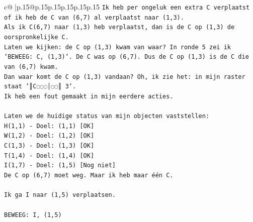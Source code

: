 \documentclass{article}
\begin{document}
{\begin{supertabular}{c@{$\;$}|p{.15\linewidth}@{}p{.15\linewidth}p{.15\linewidth}p{.15\linewidth}p{.15\linewidth}p{.15\linewidth}}
{{{\texttt{Ik heb per ongeluk een extra C verplaatst of ik heb de C van (6,7) al verplaatst naar (1,3).} \\
\texttt{Als ik C(6,7) naar (1,3) heb verplaatst, dan is de C op (1,3) de oorspronkelijke C.} \\
\texttt{Laten we kijken: de C op (1,3) kwam van waar? In ronde 5 zei ik `BEWEEG: C, (1,3)`. De C was op (6,7). Dus de C op (1,3) is de C die van (6,7) kwam.} \\
\texttt{Dan waar komt de C op (1,3) vandaan? Oh, ik zie het: in mijn raster staat `║C◌◌◌│◌◌║ 3`.} \\
\texttt{Ik heb een fout gemaakt in mijn eerdere acties.} \\
\\ 
\texttt{Laten we de huidige status van mijn objecten vaststellen:} \\
\texttt{H(1,1) {-} Doel: (1,1) {[}OK{]}} \\
\texttt{W(1,2) {-} Doel: (1,2) {[}OK{]}} \\
\texttt{C(1,3) {-} Doel: (1,3) {[}OK{]}} \\
\texttt{T(1,4) {-} Doel: (1,4) {[}OK{]}} \\
\texttt{I(1,7) {-} Doel: (1,5) {[}Nog niet{]}} \\
\texttt{De C op (6,7) moet weg. Maar ik heb maar één C.} \\
\\ 
\texttt{Ik ga I naar (1,5) verplaatsen.} \\
\\ 
\texttt{BEWEEG: I, (1,5)} \\
            }
        }
    }
     \\ \\


\end{supertabular}}
\end{document}
